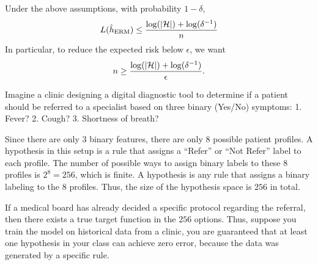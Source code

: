 \begin{mdframed}[
    roundcorner=10pt,
    leftmargin=0.1\textwidth,
    rightmargin=0.1\textwidth]
    Under the above assumptions, with probability $1 - \delta$,
    \begin{align}\label{eq_realizable} L(\hat h_{\textup{ERM}}) \le \frac {\log(\left\lvert\mathcal{H}\right\rvert) + \log(\delta^{-1})} {n} \end{align}
    In particular, to reduce the expected risk below $\epsilon$, we want \[ n \ge \frac {\log(\left\lvert\mathcal{H}\right\rvert) + \log(\delta^{-1})} {\epsilon}. \]
\end{mdframed}

\begin{example}
    Imagine a clinic designing a digital diagnostic tool to determine if a patient should be referred to a specialist based on three binary (Yes/No) symptoms:
    1. Fever? 2. Cough? 3. Shortness of breath?

    Since there are only $3$ binary features, there are only $8$ possible patient profiles.
    A hypothesis in this setup is a rule that assigns a ``Refer'' or ``Not Refer'' label to each profile.
    The number of possible ways to assign binary labels to these $8$ profiles is $2^8 = 256$, which is finite.
    A hypothesis is any rule that assigns a binary labeling to the $8$ profiles.
    Thus, the size of the hypothesis space is $256$ in total.

    If a medical board has already decided a specific protocol regarding the referral, then there exists a true target function in the $256$ options.
    Thus, suppose you train the model on historical data from a clinic, you are guaranteed that at least one hypothesis in your class can achieve zero error, because the data was generated by a specific rule.
\end{example}


